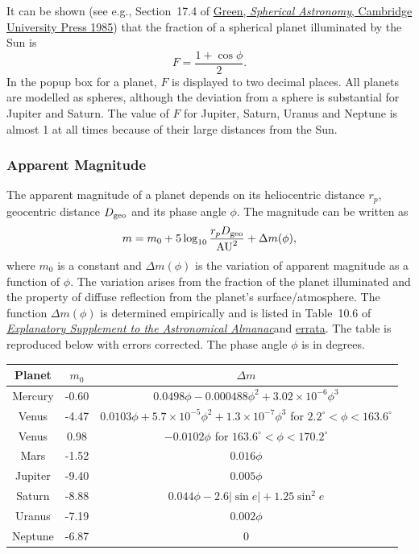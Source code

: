 \documentclass[12pt]{article}
\newcommand \beq {\begin{equation}}
\newcommand \eeq {\end{equation}}
\newcommand{\expl}{\href{http://www.uscibooks.com/urban.htm}{\it Explanatory Supplement to the Astronomical Almanac}}
\begin{document}
It can be shown (see e.g., Section~17.4 of 
\href{https://www.amazon.com/Spherical-Astronomy-Robin-M-Green/dp/0521317797}
{Green, {\it Spherical Astronomy}, Cambridge University Press 1985}) that the fraction 
of a spherical planet illuminated by the Sun is 
\beq
  F = \frac{1+\cos \phi}{2} .
\eeq
In the popup box for a planet, $F$ is displayed to two decimal places. All planets 
are modelled as spheres, although the deviation from a sphere is substantial for Jupiter 
and Saturn. The value of 
$F$ for Jupiter, Saturn, Uranus and Neptune is almost 1 at all times because of their 
large distances from the Sun. 

\subsubsection{Apparent Magnitude}

The apparent magnitude of a planet depends on its heliocentric distance $r_p$, 
geocentric distance $D_{\rm geo}$ and its phase angle $\phi$. The magnitude 
can be written as
\beq
  m = m_0 + 5\log_{10} \frac{r_p D_{\rm geo}}{{\rm AU}^2} + \Delta m(\phi) ,
\eeq
where $m_0$ is a constant and $\Delta m(\phi)$ is the variation of apparent 
magnitude as a function of $\phi$. The variation arises from the fraction of 
the planet illuminated and the property of diffuse reflection from the planet's 
surface/atmosphere. The function $\Delta m(\phi)$ is determined empirically and is 
listed in Table~10.6 of \expl and 
\href{http://aa.usno.navy.mil/publications/docs/exp_supp_errata.pdf}{errata}. 
The table is reproduced below with errors corrected. The phase angle $\phi$ is 
in degrees.

\begin{tabular}{ccc}
\hline
 Planet & $m_0$ & $\Delta m$ \\ 
\hline
 Mercury & -0.60 & $0.0498 \phi - 0.000488 \phi^2 + 3.02\times 10^{-6} \phi^3$ \\ 
 Venus & -4.47 & $0.0103\phi + 5.7\times 10^{-5} \phi^2 + 1.3\times 10^{-7} \phi^3$ 
for $2.2^\circ < \phi < 163.6^\circ$ \\ 
 Venus & 0.98 & $-0.0102\phi$ for $163.6^\circ < \phi < 170.2^\circ$ \\ 
Mars & -1.52 & $0.016\phi$ \\ 
Jupiter & -9.40 & $0.005\phi$ \\ 
Saturn & -8.88 & $0.044\phi - 2.6 |\sin e| + 1.25\sin^2 e$ \\ 
Uranus & -7.19 & $0.002\phi$ \\ 
Neptune & -6.87 & 0 \\
\hline
\end{tabular}
\end{document}
